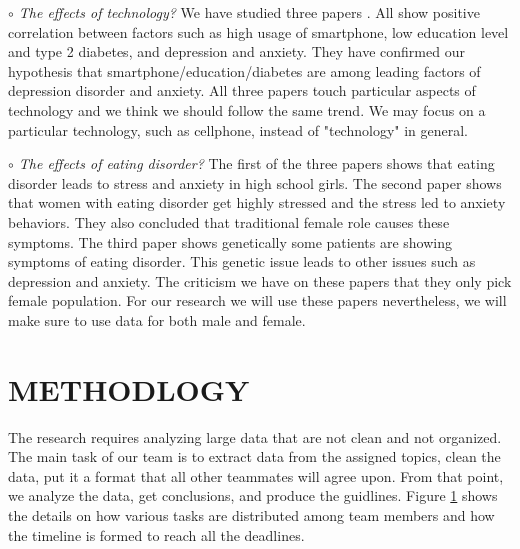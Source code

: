 \documentclass[letterpaper, 10 pt, conference]{ieeeconf}  %
\begin{document}
\par\noindent\textit{$\circ$ The effects of technology?}\newline
We have studied three papers \cite{demirci2015relationship}\cite{bjelland2008does}\cite{mezuk2008influence}. All show positive correlation between 
factors such as high usage of smartphone, low education level and type 2 
diabetes, and depression and anxiety. They have confirmed our hypothesis 
that smartphone/education/diabetes are among leading factors of depression 
disorder and anxiety. All three papers touch particular aspects of technology and we think we should follow the same trend.
We may focus on a particular technology, such as cellphone, instead of "technology" in general. 

\par\noindent\textit{$\circ$ The effects of eating disorder?}\newline
The 
first of the three papers \cite{sassaroli2005role} shows that eating disorder leads to stress and anxiety in 
high school girls. The second paper \cite{martz1995relationship} shows that women with eating disorder 
get highly stressed and the stress led to anxiety behaviors. They also concluded that 
traditional female role causes these symptoms. The third paper \cite{striegel2007risk} shows genetically 
some patients are showing symptoms of eating disorder. This genetic issue leads 
to other issues such as depression and anxiety. The criticism we have on these papers that they only pick 
female population. For our research we will use 
these papers nevertheless, we will make sure to use data for both male and female.  

\section{METHODLOGY}
The research requires analyzing large data that are not clean and not organized. 
The main task of our team is to
extract data from the assigned topics, clean the data, put it a format that all 
other teammates will agree upon. From that point, we analyze the data, get conclusions, and produce the guidlines.  
Figure \ref{fig:schedule} shows the details on how various tasks are distributed among team members 
and how the timeline is formed to reach all the deadlines. 

%
\captionsetup[figure]{labelformat=empty}
\clearpage 
\begin{figure}[hbt!]
        \centering
        
        \addvspace{250pt}
        
        \hspace{-10cm}
        
        \caption{}
        \label{fig:schedule}
\end{figure}

\clearpage 




\end{document}

